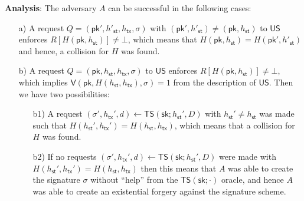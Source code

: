 \documentclass{article}
\newcommand{\pubkey}[0]{\mathsf{pk}}
\newcommand{\prikey}[0]{\mathsf{sk}}
\newcommand{\sthash}[0]{h_\mathsf{st}}
\newcommand{\txhash}[0]{h_\mathsf{tx}}
\begin{document}
\noindent\textbf{Analysis}: The adversary $A$ can be successful in the following cases:
\begin{itemize}
\item[a)] A request $Q=(\pubkey', h'_\mathsf{st}, h_\mathsf{tx}, \sigma)$ with $(\pubkey',h'_\mathsf{st})\neq (\pubkey,h_\mathsf{st})$ to $\mathsf{US}$ enforces $R[H(\pubkey, h_\mathsf{st})]\neq\bot$, which means that  $H(\pubkey,h_\mathsf{st})=H(\pubkey', h'_\mathsf{st})$ and hence, a collision for $H$ was found.
\item[b)] A request $Q=(\pubkey, h_\mathsf{st}, h_\mathsf{tx}, \sigma)$ to $\mathsf{US}$ enforces $R[H(\pubkey, h_\mathsf{st})]\neq\bot$, which implies $\mathsf{V}(\pubkey, H(h_\mathsf{st},h_\mathsf{tx}), \sigma)=1$ from the description of $\mathsf{US}$. Then we have two possibilities:
\begin{itemize}
\item[b1)] A request $(\sigma',\txhash',d)\gets\mathsf{TS}(\prikey;\sthash',D)$ with $\sthash'\neq h_\mathsf{st}$ was made such that
$H(\sthash',\txhash')=H(\sthash,\txhash)$, which means that a collision for $H$ was found.
\item[b2)] If no requests $(\sigma',\txhash',d)\gets\mathsf{TS}(\prikey;\sthash',D)$ were made with $H(\sthash',\txhash')=H(\sthash,\txhash)$ then this means that $A$ was able to create the signature $\sigma$ without ``help'' from the $\mathsf{TS}(\prikey;\cdot)$ oracle, and hence $A$ was able to create an existential forgery against the signature scheme.
\end{itemize}
\end{itemize}
\end{document}

